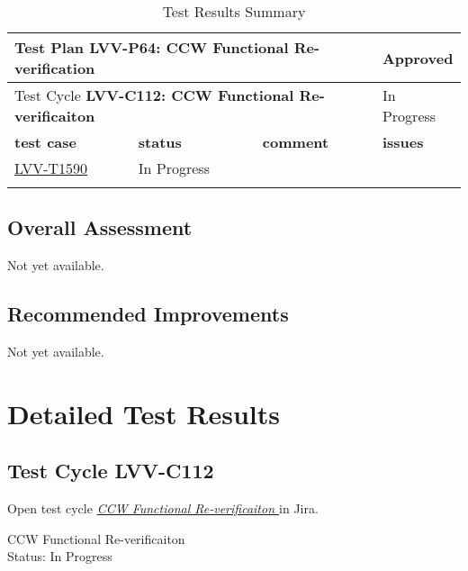 \documentclass[SE,lsstdraft,STR,toc]{lsstdoc}
\begin{document}
\begin{longtable}{p{2cm}p{2.5cm}p{9cm}p{2.5cm}}
\toprule
\multicolumn{3}{l}{ Test Plan {\bf LVV-P64: CCW Functional Re-verification
 }} & Approved \\\hline

  \multicolumn{3}{l}{ Test Cycle {\bf LVV-C112: CCW Functional Re-verificaiton
 }} & In Progress \\\hline

  {\bf \footnotesize test case} & {\bf \footnotesize status} & {\bf \footnotesize comment} & {\bf \footnotesize issues} \\\toprule

    \href{https://jira.lsstcorp.org/secure/Tests.jspa#/testCase/LVV-T1590}{LVV-T1590}
    & In Progress &
    \begin{minipage}[]{9cm}
    \smallskip
    
    \medskip
    \end{minipage}
    &
    \\\hline
\caption{Test Results Summary}
\label{table:summary}
\end{longtable}

\subsection{Overall Assessment}
\label{sect:overallassessment}

Not yet available.

\subsection{Recommended Improvements}
\label{sect:recommendations}

Not yet available.

\newpage
\section{Detailed Test Results}
\label{sect:detailedtestresults}

\subsection{Test Cycle LVV-C112 }

Open test cycle {\it \href{https://jira.lsstcorp.org/secure/Tests.jspa#/testrun/LVV-C112}{CCW Functional Re-verificaiton
}} in Jira.

CCW Functional Re-verificaiton
\\
Status: In Progress
\end{document}
